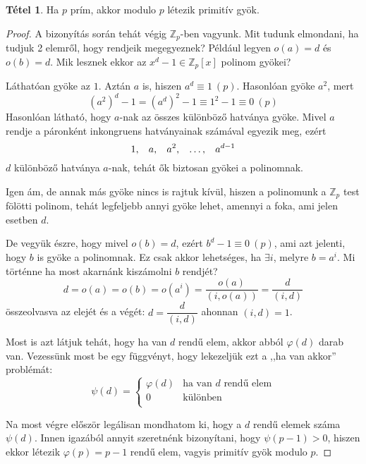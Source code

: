 \documentclass[12pt]{book}
\theoremstyle{plain} %
\theoremstyle{definition} %
\newtheorem{theo/}{Tétel}[section]
\newenvironment{theo}
  {\renewcommand{\qedsymbol}{$\clubsuit$}%
   \pushQED{\qed}\begin{theo/}}
  {\popQED\end{theo/}}
\theoremstyle{remark}
\renewcommand\qedsymbol{$\blacksquare$}
\numberwithin{equation}{section}  %
\begin{document}
	\begin{theo}\label{tudnikell}
		Ha $p$ prím, akkor modulo $p$ létezik primitív gyök.
	\end{theo}

	\begin{proof}
		A bizonyítás során tehát végig $\mathbb{Z}_p$-ben vagyunk. Mit tudunk elmondani, ha tudjuk 2 elemről, hogy rendjeik megegyeznek? Például legyen $o(a)=d$ és $o(b)=d$. Mik lesznek ekkor az $x^d-1\in \mathbb{Z}_p[x]$ polinom gyökei?
		
		Láthatóan gyöke az $1$. Aztán $a$ is, hiszen $a^d\equiv 1 \ (p)$. Hasonlóan gyöke $a^2$, mert \[ (a^2)^d -1 = (a^d)^2-1 \equiv 1^2-1 \equiv 0 \ (p) \]
		Hasonlóan látható, hogy $a$-nak az összes különböző hatványa gyöke. Mivel $a$ rendje a páronként inkongruens hatványainak számával egyezik meg, ezért
		\[ 1, \hspace{3mm} a, \hspace{3mm} a^2, \hspace{3mm} \ldots,  \hspace{3mm} a^{d-1}  \]
		$d$ különböző hatványa $a$-nak, tehát ők biztosan gyökei a polinomnak.
		
		Igen ám, de annak más gyöke nincs is rajtuk kívül, hiszen a polinomunk a $\mathbb{Z}_p$ test fölötti polinom, tehát legfeljebb annyi gyöke lehet, amennyi a foka, ami jelen esetben $d$.
		
		De vegyük észre, hogy mivel $o(b)=d$, ezért $b^d-1\equiv 0 \ (p)$, ami azt jelenti, hogy $b$ is gyöke a polinomnak. Ez csak akkor lehetséges, ha $\exists i$, melyre $b = a^i$. Mi történne ha most akarnánk kiszámolni $b$ rendjét?
		\[ d = o(a) = o(b) = o(a^i) = \dfrac{o(a)}{(i,o(a))}  = \dfrac{d}{(i,d)}  \]
		összeolvasva az elejét és a végét: $d=\dfrac{d}{(i,d)}$ ahonnan $(i,d)=1$.
		
		Most is azt látjuk tehát, hogy ha van $d$ rendű elem, akkor abból $\varphi(d)$ darab van. Vezessünk most be egy függvényt, hogy lekezeljük ezt a ,,ha van akkor'' problémát:
		\[ \psi(d) = \begin{cases*}
		\varphi(d) & \text{ha van $d$ rendű elem} \\
		0 & \text{különben}\\
		\end{cases*}  \]
		
		Na most végre először legálisan mondhatom ki, hogy a $d$ rendű elemek száma $\psi(d)$. Innen igazából annyit szeretnénk bizonyítani, hogy $\psi(p-1)>0$, hiszen ekkor létezik $\varphi(p) = p-1$ rendű elem, vagyis primitív gyök modulo $p$.
		

\end{proof}
\end{document}
